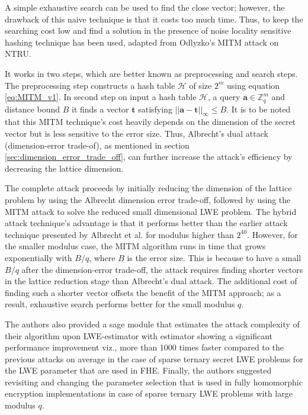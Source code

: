 A simple exhaustive search can be used to find the close vector; however, the drawback of this naive technique is that it costs too much time. Thus, to keep the searching cost low and find a solution in the presence of noise locality sensitive hashing technique has been used, adapted from Odlyzko’s MITM attack on NTRU.

It works in two steps, which are better known as preprocessing and search steps. The preprocessing step constructs a hash table $\mathcal{H}$ of size $2^m$ using equation \ref{eq:MITM_v1}. In second step on input a hash table $\mathcal{H}$, a query $\pmb{a} \in \mathbb{Z}^m_q$ and distance bound $B$ it finds a vector $\pmb{t}$ satisfying $||\pmb{a}-\pmb{t}||_{\infty} \leq B$. It is to be noted that this MITM technique’s cost heavily depends on the dimension of the secret vector but is less sensitive to the error size. Thus, Albrecht’s dual attack (dimension-error trade-of), as mentioned in section \ref{sec:dimension_error_trade_off}, can further increase the attack’s efficiency by decreasing the lattice dimension.

The complete attack proceeds by initially reducing the dimension of the lattice problem by using the Albrecht dimension error trade-off, followed by using the MITM attack to solve the reduced small dimensional LWE problem. The hybrid attack technique’s advantage is that it performs better than the earlier attack technique presented by Albrecht et al. \cite{albrecht2017dual} for modulus higher than $2^{40}$. However, for the smaller modulus case, the MITM algorithm runs in time that grows exponentially with $B/q$, where $B$ is the error size. This is because to have a small $B/q$ after the dimension-error trade-off, the attack requires finding shorter vectors in the lattice reduction stage than Albrecht’s dual attack. The additional cost of finding such a shorter vector offsets the benefit of the MITM approach; as a result, exhaustive search performs better for the small modulus $q$.


The authors also provided
a sage module that estimates the attack complexity of their algorithm upon LWE-estimator with estimator showing a significant performance improvement viz., more than 1000 times faster compared to the previous attacks on average in the case of sparse ternary secret LWE problems for the LWE parameter that are used in FHE. Finally, the authors suggested revisiting and changing the parameter selection that is used in fully homomorphic encryption implementations in case of sparse ternary LWE problems with large modulus $q$.






